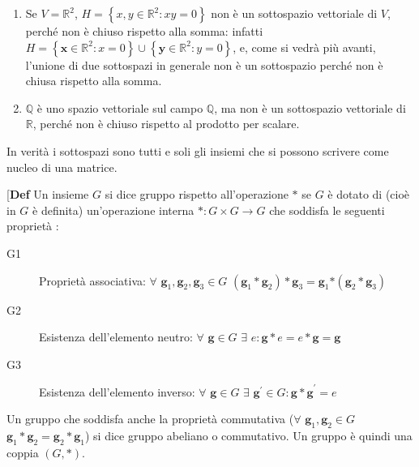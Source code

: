 \documentclass{article}
\begin{document}
\begin{enumerate}
\item Se $V=%
\mathbb{R}
^{2}$, $H=\left\{ x,y\in 
\mathbb{R}
^{2}:xy=0\right\} $ non \`{e} un sottospazio vettoriale di $V$, perch\'{e}
non \`{e} chiuso rispetto alla somma: infatti $H=\left\{ \mathbf{x}\in 
\mathbb{R}
^{2}:x=0\right\} \cup \left\{ \mathbf{y}\in 
\mathbb{R}
^{2}:y=0\right\} $, e, come si vedr\`{a} pi\`{u} avanti, l'unione di due
sottospazi in generale non \`{e} un sottospazio perch\'{e} non \`{e} chiusa
rispetto alla somma.

\item $%
\mathbb{Q}
$ \`{e} uno spazio vettoriale sul campo $%
\mathbb{Q}
$, ma non \`{e} un sottospazio vettoriale di $%
\mathbb{R}
$, perch\'{e} non \`{e} chiuso rispetto al prodotto per scalare.
\end{enumerate}

In verit\`{a} i sottospazi sono tutti e soli gli insiemi che si possono
scrivere come nucleo di una matrice.

[\textbf{Def} Un insieme $G$ si dice gruppo rispetto all'operazione $\ast $
se $G$ \`{e} dotato di (cio\`{e} in $G$ \`{e} definita) un'operazione
interna $\ast :G\times G\rightarrow G$ che soddisfa le seguenti propriet\`{a}%
:

\begin{description}
\item[G1] Propriet\`{a} associativa: $\forall $ $\mathbf{g}_{1}\mathbf{,g}%
_{2}\mathbf{,g}_{3}\in G$ $\left( \mathbf{g}_{1}\ast \mathbf{g}_{2}\right)
\ast \mathbf{g}_{3}=\mathbf{g}_{1}\mathbf{\ast }\left( \mathbf{g}_{2}\ast 
\mathbf{g}_{3}\right) $

\item[G2] Esistenza dell'elemento neutro: $\forall $ $\mathbf{g}\in G$ $%
\exists $ $e:\mathbf{g}\ast e=e\ast \mathbf{g}=\mathbf{g}$

\item[G3] Esistenza dell'elemento inverso: $\forall $ $\mathbf{g}\in G$ $%
\exists $ $\mathbf{g}^{\prime }\in G:\mathbf{g\ast g}^{\prime }\mathbf{=}e$
\end{description}

Un gruppo che soddisfa anche la propriet\`{a} commutativa ($\forall $ $%
\mathbf{g}_{1}\mathbf{,g}_{2}\in G$ $\mathbf{g}_{1}\ast \mathbf{g}_{2}=%
\mathbf{g}_{2}\ast \mathbf{g}_{1}$) si dice gruppo abeliano o commutativo.
Un gruppo \`{e} quindi una coppia $\left( G,\ast \right) $.
\end{document}
